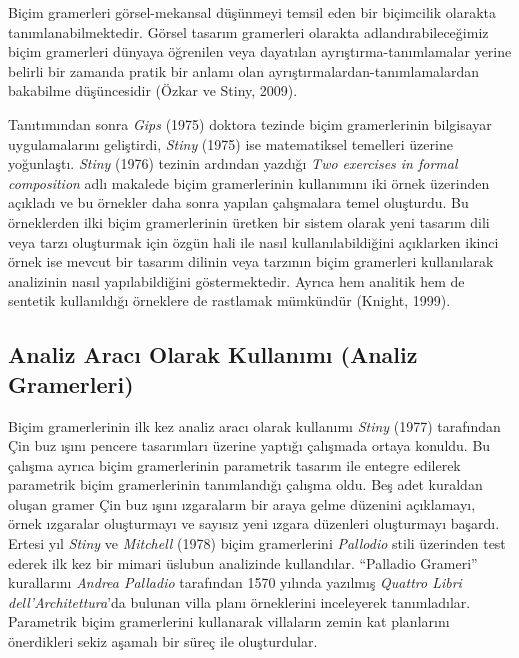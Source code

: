 \documentclass[12pt,turkish,a4paperpaper,]{report}
\begin{document}
Biçim gramerleri görsel-mekansal düşünmeyi temsil eden bir biçimcilik
olarakta tanımlanabilmektedir. Görsel tasarım gramerleri olarakta
adlandırabileceğimiz biçim gramerleri dünyaya öğrenilen veya dayatılan
ayrıştırma-tanımlamalar yerine belirli bir zamanda pratik bir anlamı
olan ayrıştırmalardan-tanımlamalardan bakabilme düşüncesidir (Özkar ve
Stiny, 2009).

Tanıtımından sonra \emph{Gips} (1975) doktora tezinde biçim
gramerlerinin bilgisayar uygulamalarını geliştirdi, \emph{Stiny} (1975)
ise matematiksel temelleri üzerine yoğunlaştı. \emph{Stiny} (1976)
tezinin ardından yazdığı \emph{Two exercises in formal composition} adlı
makalede biçim gramerlerinin kullanımını iki örnek üzerinden açıkladı ve
bu örnekler daha sonra yapılan çalışmalara temel oluşturdu. Bu
örneklerden ilki biçim gramerlerinin üretken bir sistem olarak yeni
tasarım dili veya tarzı oluşturmak için özgün hali ile nasıl
kullanılabildiğini açıklarken ikinci örnek ise mevcut bir tasarım
dilinin veya tarzının biçim gramerleri kullanılarak analizinin nasıl
yapılabildiğini göstermektedir. Ayrıca hem analitik hem de sentetik
kullanıldığı örneklere de rastlamak mümkündür (Knight, 1999).

\hypertarget{analiz-aracux131-olarak-kullanux131mux131-analiz-gramerleri}{%
\subsection{Analiz Aracı Olarak Kullanımı (Analiz
Gramerleri)}\label{analiz-aracux131-olarak-kullanux131mux131-analiz-gramerleri}}

Biçim gramerlerinin ilk kez analiz aracı olarak kullanımı \emph{Stiny}
(1977) tarafından Çin buz ışını pencere tasarımları üzerine yaptığı
çalışmada ortaya konuldu. Bu çalışma ayrıca biçim gramerlerinin
parametrik tasarım ile entegre edilerek parametrik biçim gramerlerinin
tanımlandığı çalışma oldu. Beş adet kuraldan oluşan gramer Çin buz ışını
ızgaraların bir araya gelme düzenini açıklamayı, örnek ızgaralar
oluşturmayı ve sayısız yeni ızgara düzenleri oluşturmayı başardı. Ertesi
yıl \emph{Stiny} ve \emph{Mitchell} (1978) biçim gramerlerini
\emph{Pallodio} stili üzerinden test ederek ilk kez bir mimari üslubun
analizinde kullandılar. ``Palladio Grameri'' kurallarını \emph{Andrea
Palladio} tarafından 1570 yılında yazılmış \emph{Quattro Libri
dell'Architettura}'da bulunan villa planı örneklerini inceleyerek
tanımladılar. Parametrik biçim gramerlerini kullanarak villaların zemin
kat planlarını önerdikleri sekiz aşamalı bir süreç ile oluşturdular.
\end{document}
